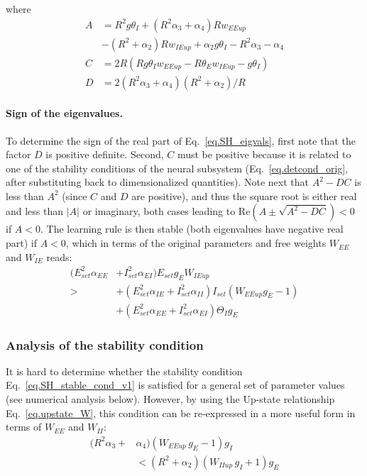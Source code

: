 \documentclass[twocolumn]{article}
\newcommand{\EE}{\mathit{EE}}
\newcommand{\EI}{\mathit{EI}}
\newcommand{\IE}{\mathit{IE}}
\newcommand{\II}{\mathit{II}}
\newcommand{\set}{\mathit{set}}
\newcommand{\up}{\mathit{up}}
\newcommand{\RE}{\mathrm{Re}}
\begin{document}
\noindent where
\begin{equation}
\begin{aligned}
A & = R^2 g \theta_I + (R^2 \alpha_3 + \alpha_4) R w_{\EE\up} \\
& - (R^2 + \alpha_2)R w_{\IE\up} + \alpha_2 g \theta_I - R^2 \alpha_3 - \alpha_4 \\
C & = 2R(R g \theta_I w_{\EE\up} - R \theta_E w_{\IE\up} - g \theta_I) \\
D & = 2(R^2\alpha_3 + \alpha_4)(R^2 + \alpha_2)/R
\end{aligned}
\end{equation}


\paragraph{Sign of the eigenvalues.}

To determine the sign of the real part of Eq.\ \ref{eq.SH_eigvals}, first note that the factor $D$ is positive definite. Second, $C$ must be positive because it is related to one of the stability conditions of the neural subsystem (Eq.\ \ref{eq.detcond_orig}, after substituting back to dimensionalized quantities). Note next that $A^2 - DC$ is less than $A^2$ (since $C$ and $D$ are positive), and thus the square root is either real and less than $|A|$ or imaginary, both cases leading to $\RE(A \pm \sqrt{A^2-DC}) < 0$ if $A<0$. The learning rule is then stable (both eigenvalues have negative real part) if $A<0$, which in terms of the original parameters and free weights $W_{\EE}$ and $W_{\IE}$ reads:
\begin{equation}
\begin{aligned}
(E_{\set}^2 \alpha_{\EE} & + I_{\set}^2 \alpha_{\EI}) E_{\set} g_E W_{\IE\up} \\
> & + (E_{\set}^2 \alpha_{\IE} + I_{\set}^2 \alpha_{\II}) I_{\set}(W_{\EE\up} g_E - 1) \\
& + (E_{\set}^2 \alpha_{\EE} + I_{\set}^2 \alpha_{\EI}) \Theta_I g_E
\end{aligned}
\label{eq.SH_stable_cond_v1}
\end{equation}


\subsubsection{Analysis of the stability condition}

It is hard to determine whether the stability condition Eq.\ \ref{eq.SH_stable_cond_v1} is satisfied for a general set of parameter values (see numerical analysis below). However, by using the Up-state relationship Eq.\ \ref{eq.upstate_W}, this condition can be re-expressed in a more useful form in terms of $W_{\EE}$ and $W_{\II}$:
\begin{equation}
\begin{aligned}
(R^2 \alpha_3 + & \alpha_4)(W_{\EE\up} \, g_E  - 1)g_I \\
& < (R^2 + \alpha_2)(W_{\II\up} \, g_I + 1)g_E
\end{aligned}
\label{eq.SH_stable_cond_v2}
\end{equation}
\end{document}
